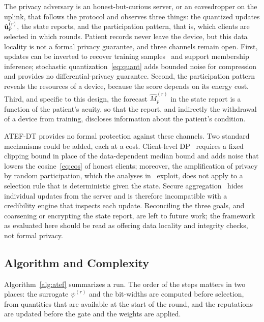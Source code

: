 \begin{revblock}The privacy adversary is an honest-but-curious server, or an eavesdropper on the uplink, that follows the protocol and observes three things: the quantized updates $\hat{\mathbf{u}}_p^{(r)}$, the state reports, and the participation pattern, that is, which clients are selected in which rounds. Patient records never leave the device, but this data locality is not a formal privacy guarantee, and three channels remain open. First, updates can be inverted to recover training samples~\cite{zhu2019deep} and support membership inference; stochastic quantization~\eqref{eq:quant} adds bounded noise for compression and provides no differential-privacy guarantee. Second, the participation pattern reveals the resources of a device, because the score depends on its energy cost. Third, and specific to this design, the forecast $\widehat{M}_p^{(r)}$ in the state report is a function of the patient's acuity, so that the report, and indirectly the withdrawal of a device from training, discloses information about the patient's condition.

ATEF-DT provides no formal protection against these channels. Two standard mechanisms could be added, each at a cost. Client-level DP~\cite{wei2020federated} requires a fixed clipping bound in place of the data-dependent median bound and adds noise that lowers the cosine~\eqref{eq:cos} of honest clients; moreover, the amplification of privacy by random participation, which the analyses in~\cite{li2025differentially,li2025federated} exploit, does not apply to a selection rule that is deterministic given the state. Secure aggregation~\cite{bonawitz2017practical} hides individual updates from the server and is therefore incompatible with a credibility engine that inspects each update. Reconciling the three goals, and coarsening or encrypting the state report, are left to future work; the framework as evaluated here should be read as offering data locality and integrity checks, not formal privacy.\end{revblock}

\subsection{Algorithm and Complexity}
\label{subsec:algorithm}
Algorithm~\ref{alg:atef} summarizes a run. The order of the steps matters in two places: the surrogate $\psi^{(r)}$ and the bit-widths are computed before selection, from quantities that are available at the start of the round, and the reputations are updated before the gate and the weights are applied.

